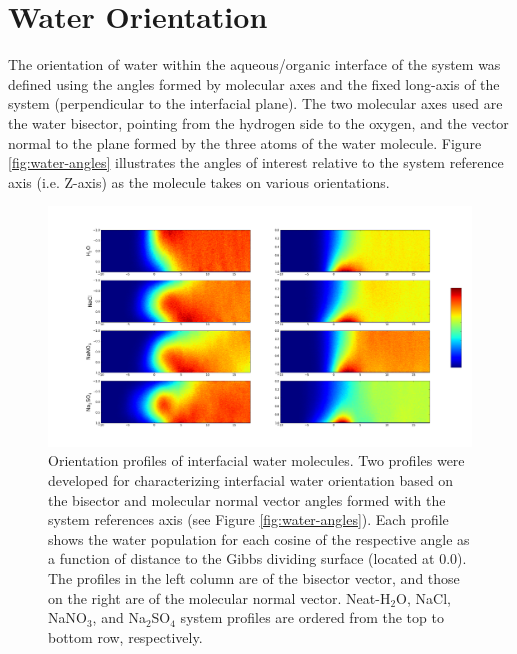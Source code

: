 \section{Water Orientation}
The orientation of water within the aqueous/organic interface of the system was defined using the angles formed by molecular axes and the fixed long-axis of the system (perpendicular to the interfacial plane). The two molecular axes used are the water bisector, pointing from the hydrogen side to the oxygen, and the vector normal to the plane formed by the three atoms of the water molecule. Figure \ref{fig:water-angles} illustrates the angles of interest relative to the system reference axis (i.e. Z-axis) as the molecule takes on various orientations.


\begin{figure}[h!]
\begin{center}
	\includegraphics[scale=0.26]{images/h2o-2dhistograms.png}
	\caption{Orientation profiles of interfacial water molecules. Two profiles were developed for characterizing interfacial water orientation based on the bisector and molecular normal vector angles formed with the system references axis (see Figure \ref{fig:water-angles}). Each profile shows the water population for each cosine of the respective angle as a function of distance to the Gibbs dividing surface (located at 0.0). The profiles in the left column are of the bisector vector, and those on the right are of the molecular normal vector. Neat-H$_2$O, NaCl, NaNO$_3$, and Na$_2$SO$_4$ system profiles are ordered from the top to bottom row, respectively.}
	\label{fig:system-orientations}
\end{center}
\end{figure}


